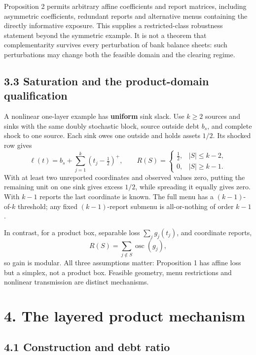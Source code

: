 \documentclass[
  british,
  11pt,
  a4paper,
]{article}
\begin{document}
Proposition 2 permits arbitrary affine coefficients and report matrices,
including asymmetric coefficients, redundant reports and alternative
menus containing the directly informative exposure. This supplies a
restricted-class robustness statement beyond the symmetric example. It
is not a theorem that complementarity survives every perturbation of
bank balance sheets: such perturbations may change both the feasible
domain and the clearing regime.

\subsection{3.3 Saturation and the product-domain
qualification}\label{saturation-and-the-product-domain-qualification}

A nonlinear one-layer example has \textbf{uniform} sink slack. Use
\(k\ge2\) sources and sinks with the same doubly stochastic block,
source outside debt \(b_s\), and complete shock to one source. Each sink
owes one outside and holds assets \(1/2\). Its shocked row gives \[
\ell(t)=b_s+\sum_{j=1}^k(t_j-\tfrac12)^+,\qquad
R(S)=
\begin{cases}\tfrac12,&|S|\le k-2,\\0,&|S|\ge k-1.\end{cases}
\tag{12}
\] With at least two unreported coordinates and observed values zero,
putting the remaining unit on one sink gives excess \(1/2\), while
spreading it equally gives zero. With \(k-1\) reports the last
coordinate is known. The full menu has a \((k-1)\)-of-\(k\) threshold;
any fixed \((k-1)\)-report submenu is all-or-nothing of order \(k-1\).

In contrast, for a product box, separable loss \(\sum_jg_j(t_j)\), and
coordinate reports, \[
R(S)=\sum_{j\notin S}\operatorname{osc}(g_j),
\tag{13}
\] so gain is modular. All three assumptions matter: Proposition 1 has
affine loss but a simplex, not a product box. Feasible geometry, menu
restrictions and nonlinear transmission are distinct mechanisms.

\section{4. The layered product
mechanism}\label{the-layered-product-mechanism}

\subsection{4.1 Construction and debt
ratio}\label{construction-and-debt-ratio}
\end{document}
